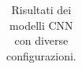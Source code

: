 \begin{table}
\caption{Risultati dei modelli CNN con diverse configurazioni.}
\label{tab:cnn_results}
\begin{tabular}{lcccccc}
\toprule
\midrule
\bottomrule
\end{tabular}
\end{table}

